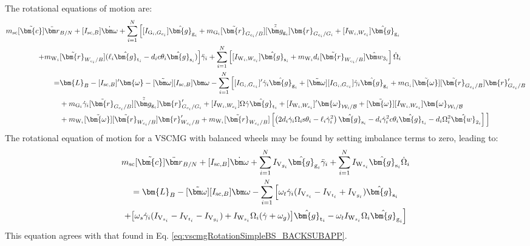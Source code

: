 The rotational equations of motion are:
\begin{equation}
	\begin{split}
		m_{\text{\text{sc}}}[\tilde{\bm{c}}]\ddot{\bm r}&_{B/N} + [I_{\text{sc},B}]\dot{\bm\omega}
		+\sum\limits_{i=1}^{N} \Big[ [I_{\text{G}_i,G_{c_i}}]\hat{\bm{g}}_{\text{g}_i} + m_{\text{G}_i}[\tilde{\bm{r}}_{G_{c_i}/B}][\tilde{\hat{\bm g}}_{\text{g}_i}]\bm{r}_{G_{c_i}/G_i} + [I_{\text{W}_i,W_{c_i}}]\hat{\bm{g}}_{\text{g}_i}
		\\
		+ m_{\text{W}_i}&[\tilde{\bm{r}}_{W_{c_i}/B}]( \ell_i\hat{\bm{g}}_{\text{t}_i} - d_ic\theta_i\hat{\bm{g}}_{\text{s}_i}) \Big] \ddot{\gamma}_i
		+\sum\limits_{i=1}^{N} \left[ [I_{\text{W}_i,W_{c_i}}]\hat{\bm{g}}_{\text{s}_i} + m_{\text{W}_i}d_i[\tilde{\bm{r}}_{W_{c_i}/B}]\hat{\bm w}_{3_i} \right] \dot{\Omega}_i
		\\
		=& \bm{L}_B - [I_{\text{sc},B}]'\bm{\omega} - [\tilde{\bm\omega}][I_{\text{sc},B}]\bm\omega
		-\sum\limits_{i=1}^{N} \Big[
		[I_{\text{G}_i,G_{c_i}}]'\dot{\gamma}_i\hat{\bm{g}}_{\text{g}_i} + [\tilde{\bm\omega}][I_{\text{G}_i,G_{c_i}}]\dot{\gamma}_i\hat{\bm{g}}_{\text{g}_i} + m_{\text{G}_i}[\tilde{\bm{\omega}}][\tilde{\bm{r}}_{G_{c_i}/B}]\bm{r}'_{G_{c_i}/B}
		\\&+ m_{\text{G}_i}\dot{\gamma}_i[\tilde{\bm{r}}_{G_{c_i}/B}][\tilde{\hat{\bm g}}_{\text{g}_i}]\bm{r}'_{G_{c_i}/G_i}
		+ [I_{\text{W}_i,W_{c_i}}]\Omega\dot{\gamma}\hat{\bm{g}}_{\text{t}_i} + [I_{\text{W}_i,W_{c_i}}]'\bm{\omega}_{\mathcal{W}_i/\cal B} + [\tilde{\bm{\omega}}][I_{\text{W}_i,W_{c_i}}]\bm{\omega}_{\mathcal{W}_i/\cal B}
		\\
		&+ m_{\text{W}_i}[\tilde{\bm{\omega}}][\tilde{\bm{r}}_{W_{c_i}/B}]\bm{r}'_{W_{c_i}/B} + m_{\text{W}_i}[\tilde{\bm{r}}_{W_{c_i}/B}]\left[\left(2d_i\dot{\gamma}_i\Omega_i\text{s}\theta_i - \ell_i\dot{\gamma}_i^2\right)\hat{\bm{g}}_{\text{s}_i} - d_i\dot{\gamma}_i^2c\theta_i\hat{\bm{g}}_{\text{t}_i} - d_i\Omega_i^2 \hat{\bm{w}}_{2_i} \right]
		\Big]
	\end{split}
\label{eq:rotation}
\end{equation}
The rotational equation of motion for a VSCMG with balanced wheels may be found by setting imbalance terms to zero, leading to:
\begin{multline}
m_{\text{\text{sc}}}[\tilde{\bm{c}}]\ddot{\bm r}_{B/N} + [I_{\text{sc},B}]\dot{\bm\omega}
+\sum\limits_{i=1}^{N}I_{\text{V}_{g_i}}\hat{\bm{g}}_{\text{g}_i} \ddot{\gamma}_i
+\sum\limits_{i=1}^{N}I_{\text{W}_{s_i}}\hat{\bm{g}}_{\text{s}_i} \dot{\Omega}_i
\\
= \bm{L}_B - [\tilde{\bm\omega}][I_{\text{sc},B}]\bm\omega
-\sum\limits_{i=1}^{N} \Big[
\omega_t\dot{\gamma}_i(I_{\text{V}_{s_i}}-I_{\text{V}_{t_i}}+I_{\text{V}_{g_i}}) \hat{\bm{g}}_{\text{s}_i}
\\+ \big[ \omega_s\dot{\gamma}_i(I_{\text{V}_{s_i}}-I_{\text{V}_{t_i}}-I_{\text{V}_{g_i}}) + I_{\text{W}_{s_i}}\Omega_i(\dot{\gamma} + \omega_g) \big]\hat{\bm{g}}_{\text{t}_i}
-\omega_tI_{\text{W}_{s_i}}\Omega_i\hat{\bm{g}}_{\text{g}_i} \Big]
\label{eq:vscmgRotationSimple}
\end{multline}
This equation agrees with that found in Eq.  \ref{eq:vscmgRotationSimpleBS_BACKSUBAPP}.

